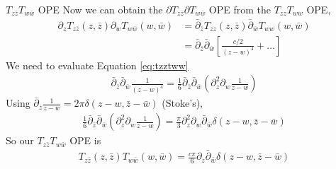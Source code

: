 \documentclass{beamer}
\begin{document}
\begin{frame}{$T_{z\bar z} T_{w \bar w}$ OPE}
    Now we can obtain the $\partial T_{z\bar z} \partial T_{w \bar w}$ OPE from the $T_{zz}T_{ww}$ OPE,
    \begin{align}
        \partial_z T_{z \bar{z}}(z, \bar{z}) \partial_w T_{w \bar{w}}(w, \bar{w})&=\bar{\partial}_{\bar{z}} T_{z z}(z, \bar{z}) \bar{\partial}_{\bar{w}} T_{w w}(w, \bar{w})\\&=\bar{\partial}_{\bar{z}} \bar{\partial}_{\bar{w}}\left[\frac{c / 2}{(z-w)^4}+\ldots\right] \label{eq:tzztww}
    \end{align}
    We need to evaluate Equation \ref{eq:tzztww}
    \begin{align}
        \bar{\partial}_{\bar{z}} \bar{\partial}_{\bar{w}} \frac{1}{(z-w)^4}=\frac{1}{6} \bar{\partial}_{\bar{z}} \bar{\partial}_{\bar{w}}\left(\partial_z^2 \partial_w \frac{1}{z-w}\right)
    \end{align}
    Using $\bar{\partial}_{\bar{z}} \frac{1}{z-w}=2 \pi \delta(z-w, \bar{z}-\bar{w})$ (Stoke's),
    \begin{align}
        \frac{1}{6} \bar{\partial}_{\bar{z}} \bar{\partial}_{\bar{w}}\left(\partial_z^2 \partial_w \frac{1}{z-w}\right)=\frac{\pi}{3} \partial_z^2 \partial_w \bar{\partial}_{\bar{w}} \delta(z-w, \bar{z}-\bar{w})
    \end{align}
    So our $T_{z\bar z} T_{w \bar w}$ OPE is
    \begin{align}
        T_{z \bar{z}}(z, \bar{z}) T_{w \bar{w}}(w, \bar{w})=\frac{c\pi}{6} \partial_z \bar{\partial}_{\bar{w}} \delta(z-w, \bar{z}-\bar{w})
    \end{align}
\end{frame}
\end{document}
